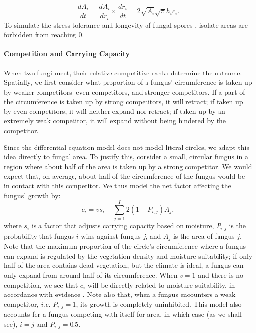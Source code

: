 \documentclass[12pt]{article}
\begin{document}

\begin{equation*}
\frac{dA_i}{dt}=\frac{dA_i}{dr_i}\times\frac{dr_i}{dt}=2\sqrt{A_i}\sqrt{\pi}h_i c_i.
\end{equation*}
To simulate the stress-tolerance and longevity of fungal spores \cite{spores}, isolate areas are forbidden from reaching 0.

\paragraph{Competition and Carrying Capacity} When two fungi meet, their relative competitive ranks determine the outcome. Spatially, we first consider what proportion of a fungus' circumference is taken up by weaker competitors, even competitors, and stronger competitors. If a part of the circumference is taken up by strong competitors, it will retract; if taken up by even competitors, it will neither expand nor retract; %
if taken up by an extremely weak competitor, it will expand without being hindered by the competitor. %

Since the differential equation model does not model literal circles, we adapt this idea directly to fungal area. To justify this, consider a small, circular fungus in a region where about half of the area is taken up by a strong competitor. We would expect that, on average, about half of the circumference of the fungus would be in contact with this competitor. We thus model the net factor affecting the fungus' growth by:
\begin{equation*}
c_i=vs_i-\sum_{j=1}^I 2(1-P_{i,j})A_j,
\end{equation*}
where $s_i$ is a factor that adjusts carrying capacity based on moisture, $P_{i,j}$ is the probability that fungus $i$ wins against fungus $j$, and $A_j$ is the area of fungus $j$. Note that the maximum proportion of the circle's circumference where a fungus can expand is regulated by the vegetation density and moisture suitability; if only half of the area contains dead vegetation, but the climate is ideal, a fungus can only expand from around half of its circumference. When $v=1$ and there is no competition, we see that $c_i$ will be directly related to moisture suitability, in accordance with evidence \cite{trait-based}. Note also that, when a fungus encounters a weak competitor, \emph{i.e.} $P_{i,j}=1$, its growth is completely uninhibited. This model also accounts for a fungus competing with itself for area, in which case (as we shall see), $i=j$ and $P_{i,j}=0.5$.
\end{document}
